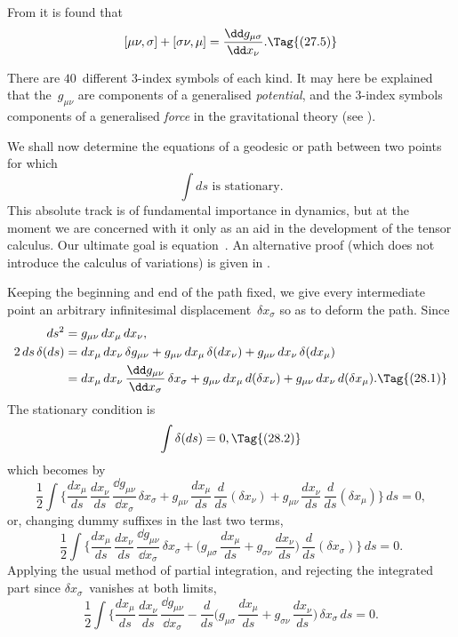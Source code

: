 \documentclass[12pt]{book}
\begin{document}
From  it is found that
\[
[\mu\nu, \sigma] + [\sigma\nu, \mu] = \frac{\dd g_{\mu\sigma}}{\dd x_{\nu}}.
\Tag{(27.5)}
\]

There are $40$~different $3$-index symbols of each kind. It may here be
explained that the~$g_{\mu\nu}$ are components of a generalised \emph{potential}, and the
%
$3$-index symbols components of a generalised \emph{force} in the gravitational
theory (see ).


We shall now determine the equations of a geodesic or path between two
points for which
\[
\int ds \text{ is stationary.}
\]
This absolute track is of fundamental importance in dynamics, but at the
moment we are concerned with it only as an aid in the development of the
tensor calculus\footnotemark.\footnotetext
  {Our ultimate goal is equation~. An alternative proof (which does not introduce the
  calculus of variations) is given in .}

Keeping the beginning and end of the path fixed, we give every intermediate
point an arbitrary infinitesimal displacement~$\delta x_{\sigma}$ so as to deform the
path. Since
\begin{align*}
  ds^{2} &= g_{\mu\nu}\, dx_{\mu}\, dx_{\nu}, \\
  2\, ds\, \delta(ds)
  &= dx_{\mu}\, dx_{\nu} \, \delta g_{\mu\nu}
  + g_{\mu\nu}\, dx_{\mu}\, \delta(dx_{\nu})
  + g_{\mu\nu}\, dx_{\nu}\, \delta(dx_{\mu}) \\
  &= dx_{\mu}\, dx_{\nu}\, \frac{\dd g_{\mu\nu}}{\dd x_{\sigma}}\, \delta x_{\sigma}
  + g_{\mu\nu}\, dx_{\mu}\, d(\delta x_{\nu})
  + g_{\mu\nu}\, dx_{\nu}\, d(\delta x_{\mu}).
  \Tag{(28.1)}
\end{align*}
The stationary condition is
\[
\int \delta(ds) = 0,
\Tag{(28.2)}
\]
which becomes by~
\[
  \frac{1}{2} \int \biggl\{
  \frac{dx_{\mu}}{ds}\, \frac{dx_{\nu}}{ds}\, \frac{\dd g_{\mu\nu}}{\dd x_{\sigma}}\, \delta x_{\sigma}
  + g_{\mu\nu}\, \frac{dx_{\mu}}{ds}\, \frac{d}{ds}(\delta x_{\nu})
  + g_{\mu\nu}\, \frac{dx_{\nu}}{ds}\, \frac{d}{ds}(\delta x_{\mu})\biggr\}\, ds = 0,
\]
or, changing dummy suffixes in the last two terms,
\[
\frac{1}{2} \int \biggl\{
\frac{dx_{\mu}}{ds}\, \frac{dx_{\nu}}{ds}\, \frac{\dd g_{\mu\nu}}{\dd x_{\sigma}}\, \delta x_{\sigma}
+ \biggl(g_{\mu\sigma}\, \frac{dx_{\mu}}{ds} + g_{\sigma\nu}\, \frac{dx_{\nu}}{ds}\biggr)\, \frac{d}{ds}(\delta x_{\sigma})\biggr\}\, ds = 0.
\]
Applying the usual method of partial integration, and rejecting the integrated
part since $\delta x_{\sigma}$~vanishes at both limits,
\[
\frac{1}{2} \int \biggl\{
\frac{dx_{\mu}}{ds}\, \frac{dx_{\nu}}{ds}\, \frac{\dd g_{\mu\nu}}{\dd x_{\sigma}}
  - \frac{d}{ds} \biggl(g_{\mu\sigma}\, \frac{dx_{\mu}}{ds} + g_{\sigma\nu}\, \frac{dx_{\nu}}{ds}\biggr)\, \delta x_{\sigma}\, ds = 0.
\]
\end{document}
